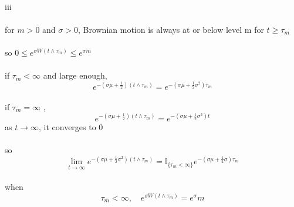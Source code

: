 \documentclass{article}
\begin{document}
\paragraph{}{iii}
\paragraph{}{for $m>0$ and $\sigma >0$, Brownian motion is always at or below level m for $t\ge \tau_{m}$}
\paragraph{}{so $0\le e^{\sigma W(t\land \tau_{m})}\le e^{\sigma m}$}
\paragraph{}{if $\mathbb{\tau}_{m}<\infty $ and large enough, \begin{displaymath}
                                                                e^{-(\sigma\mu+\frac{1}{2})(t\land \tau_{m})}=e^{-(\sigma \mu +\frac{1}{2}\sigma^{2})\tau_{m}}
                                                              \end{displaymath}}
\paragraph{}{if $\mathbb{\tau}_{m}=\infty $ , \begin{displaymath}
                                                                e^{-(\sigma\mu+\frac{1}{2})(t\land \tau_{m})}=e^{-(\sigma \mu +\frac{1}{2}\sigma^{2})t}
                                                              \end{displaymath} as $t \to \infty$, it converges to 0}
\paragraph{}{so \begin{displaymath}
                  \lim_{t \to \infty} e^{-(\sigma\mu+\frac{1}{2}\sigma^{2})(t\land \tau_{m})}=\mathbb{I}_{\{\tau_{m}<\infty\}}e^{-(\sigma\mu+ \frac{1}{2}\sigma)\tau_{m}}
                \end{displaymath} }
\paragraph{}{when \begin{displaymath}
                    \tau_{m}<\infty,\quad e^{\sigma W(t\land\tau_{m})}=e^\sigma m
                  \end{displaymath}}
\end{document}

